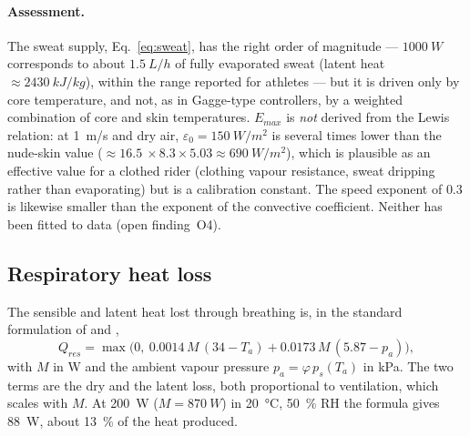 \documentclass[11pt,a4paper]{article}
\begin{document}
\paragraph{Assessment.} The sweat supply, Eq.~\eqref{eq:sweat}, has the right order of magnitude --- \(\SI{1000}{W}\) corresponds to about \(\SI{1.5}{L/h}\) of fully evaporated sweat (latent heat \(\approx\SI{2430}{kJ/kg}\)), within the range reported for athletes --- but it is driven only by core temperature, and not, as in Gagge-type controllers, by a weighted combination of core and skin temperatures. \(E_{max}\) is \emph{not} derived from the Lewis relation: at \SI{1}{m/s} and dry air, \(\varepsilon_0=\SI{150}{W/m^2}\) is several times lower than the nude-skin value (\(\approx\SI{16.5}{}\times8.3\times5.03\approx\SI{690}{W/m^2}\)), which is plausible as an effective value for a clothed rider (clothing vapour resistance, sweat dripping rather than evaporating) but is a calibration constant. The speed exponent of \(0.3\) is likewise smaller than the exponent of the convective coefficient. Neither has been fitted to data (open finding~O4).

\subsection{Respiratory heat loss}
The sensible and latent heat lost through breathing is, in the standard formulation of \citet{fanger1970} and \citet{iso7730},
\begin{equation}
 Q_{res}=\max\bigl(0,\ 0.0014\,M\,(34-T_a)+0.0173\,M\,(5.87-p_a)\bigr),
\end{equation}
with \(M\) in W and the ambient vapour pressure \(p_a=\varphi\,p_s(T_a)\) in kPa. The two terms are the dry and the latent loss, both proportional to ventilation, which scales with \(M\). At \SI{200}{W} (\(M=\SI{870}{W}\)) in \SI{20}{\degreeCelsius}, \SI{50}{\percent} RH the formula gives \SI{88}{W}, about \SI{13}{\percent} of the heat produced.
\end{document}
